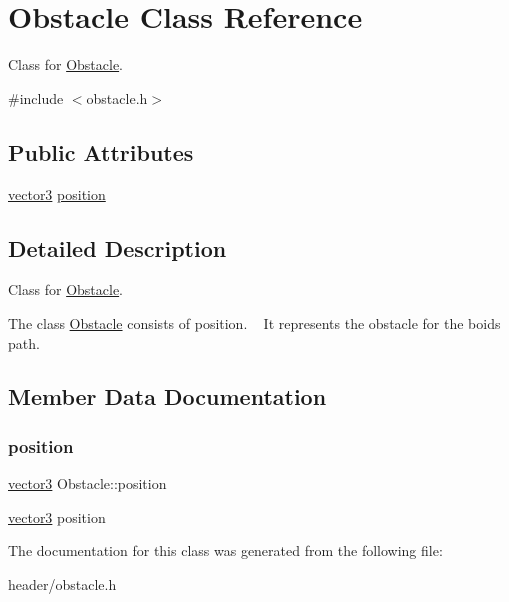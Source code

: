 \hypertarget{class_obstacle}{}\section{Obstacle Class Reference}
\label{class_obstacle}


Class for \mbox{\hyperlink{class_obstacle}{Obstacle}}.  




{\ttfamily \#include $<$obstacle.\+h$>$}

\subsection*{Public Attributes}
\begin{DoxyCompactItemize}
\item 
\mbox{\hyperlink{structvector3}{vector3}} \mbox{\hyperlink{class_obstacle_aa922311e844c549af6d75fcaeb2fad0a}{position}}
\end{DoxyCompactItemize}


\subsection{Detailed Description}
Class for \mbox{\hyperlink{class_obstacle}{Obstacle}}. 

The class \mbox{\hyperlink{class_obstacle}{Obstacle}} consists of position. ~\newline
It represents the obstacle for the boids path. 

\subsection{Member Data Documentation}
\mbox{\label{class_obstacle_aa922311e844c549af6d75fcaeb2fad0a}} 
\subsubsection{\texorpdfstring{position}{position}}
{\footnotesize\ttfamily \mbox{\hyperlink{structvector3}{vector3}} Obstacle\+::position}

\mbox{\hyperlink{structvector3}{vector3}} position 

The documentation for this class was generated from the following file\+:\begin{DoxyCompactItemize}
\item 
header/obstacle.\+h\end{DoxyCompactItemize}
